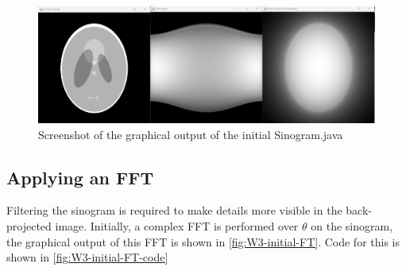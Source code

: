 \begin{figure}[H] 
    \centering
    \includegraphics[width=0.9\columnwidth]{Figures/Week 3/initial-graphics.png}
    \caption{Screenshot of the graphical output of the initial Sinogram.java}
    \label{fig:W3-initial-output}
\end{figure}


\subsection{Applying an FFT}
Filtering the sinogram is required to make details more visible in the back-projected image. Initially, a complex FFT is performed over \(\theta\) on the sinogram, the graphical output of this FFT is shown in \autoref{fig:W3-initial-FT}. Code for this is shown in \autoref{fig:W3-initial-FT-code}

